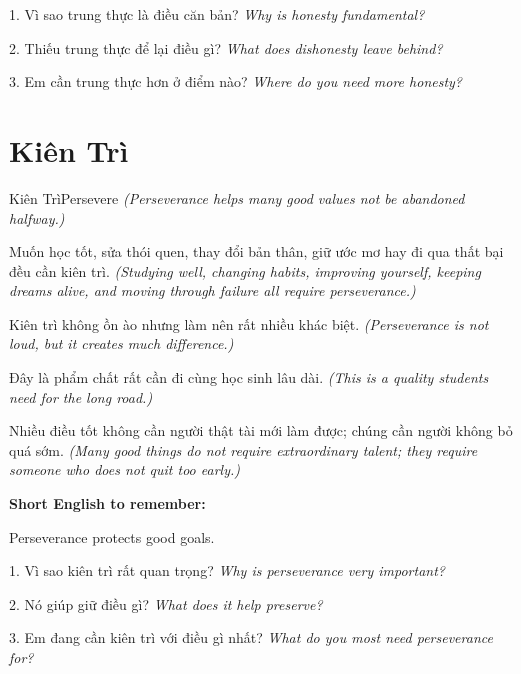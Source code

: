 \begin{tuhocnhanh}
1. Vì sao trung thực là điều căn bản? \textit{Why is honesty fundamental?}

2. Thiếu trung thực để lại điều gì? \textit{What does dishonesty leave behind?}

3. Em cần trung thực hơn ở điểm nào? \textit{Where do you need more honesty?}
\end{tuhocnhanh}
\ngancach

\section{Kiên Trì}
\begin{truyen}{Kiên Trì}{Persevere}
\textit{(Perseverance helps many good values not be abandoned halfway.)}

Muốn học tốt, sửa thói quen, thay đổi bản thân, giữ ước mơ hay đi qua thất bại đều cần kiên trì.
\textit{(Studying well, changing habits, improving yourself, keeping dreams alive, and moving through failure all require perseverance.)}

Kiên trì không ồn ào nhưng làm nên rất nhiều khác biệt.
\textit{(Perseverance is not loud, but it creates much difference.)}

Đây là phẩm chất rất cần đi cùng học sinh lâu dài.
\textit{(This is a quality students need for the long road.)}
\end{truyen}

\begin{baihoc}
Nhiều điều tốt không cần người thật tài mới làm được; chúng cần người không bỏ quá sớm.
\textit{(Many good things do not require extraordinary talent; they require someone who does not quit too early.)}
\end{baihoc}

\begin{ghinhoanh}
\textbf{Short English to remember:}

Perseverance protects good goals.

\end{ghinhoanh}

\begin{tuhocnhanh}
1. Vì sao kiên trì rất quan trọng? \textit{Why is perseverance very important?}

2. Nó giúp giữ điều gì? \textit{What does it help preserve?}

3. Em đang cần kiên trì với điều gì nhất? \textit{What do you most need perseverance for?}
\end{tuhocnhanh}
\ngancach

